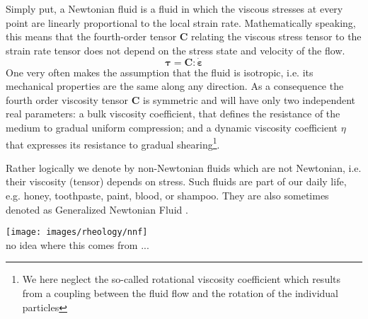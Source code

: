 
Simply put, a Newtonian fluid is a fluid in which the viscous stresses at 
every point are linearly proportional 
to the local strain rate.
Mathematically speaking, this means that the fourth-order tensor ${\bm C}$ relating the viscous stress 
tensor to the strain rate tensor does not depend on the stress state and velocity of the flow.
\begin{equation}
{\bm \tau}={\bm C} : \dot{\bm \varepsilon}
\end{equation}
One very often makes the assumption that the fluid is isotropic, i.e. its mechanical properties are the 
same along any direction. As a consequence the fourth order viscosity tensor 
${\bm C}$ is symmetric and will have only two independent real parameters: 
a bulk viscosity coefficient, that defines the resistance of the medium to gradual uniform compression; 
and a dynamic viscosity coefficient $\eta$ that expresses its resistance to gradual 
shearing\footnote{We here neglect the so-called rotational viscosity coefficient which results 
from a coupling between the fluid flow and the rotation of the individual particles}.

Rather logically we denote by non-Newtonian fluids which are not Newtonian, i.e. their viscosity (tensor)
depends on stress. Such fluids are part of our daily life, e.g. honey, toothpaste, paint, blood, or shampoo.
They are also sometimes denoted as Generalized Newtonian Fluid . 

\begin{center}
\texttt{[image: images/rheology/nnf]}\\
{\captionfont no idea where this comes from ...}
\end{center}
